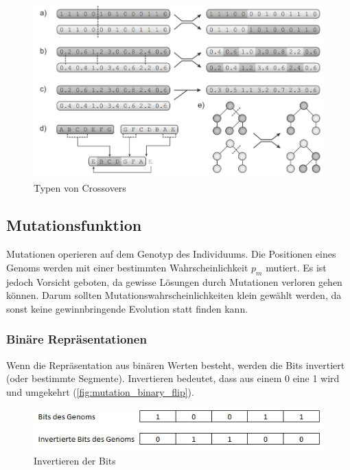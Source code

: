           \begin{figure}[H]
            \includegraphics[scale=0.7, center]{graphics/crossover_types}
            \caption[\protect{}, S.27]{Typen von Crossovers\label{fig:crossTypes}}
          \end{figure}

    \subsection{Mutationsfunktion}

      Mutationen operieren auf dem Genotyp des Individuums.
      Die Positionen eines Genoms werden mit einer bestimmten Wahrscheinlichkeit \(p_{m}\) mutiert.
      Es ist jedoch Vorsicht geboten, da gewisse Lösungen durch Mutationen verloren gehen können.
      Darum sollten Mutationswahrscheinlichkeiten klein gewählt werden,
      da sonst keine gewinnbringende Evolution statt finden kann.

      \subsubsection{Binäre Repräsentationen}

        Wenn die Repräsentation aus binären Werten besteht, werden die Bits invertiert (oder bestimmte Segmente).
        Invertieren bedeutet, dass aus einem 0 eine 1 wird und umgekehrt (\vref{fig:mutation_binary_flip}).

        \begin{figure}[H]
          \includegraphics[scale=1, center]{graphics/mutation_binary_flip}
          \caption{Invertieren der Bits\label{fig:mutation_binary_flip}}
        \end{figure}

